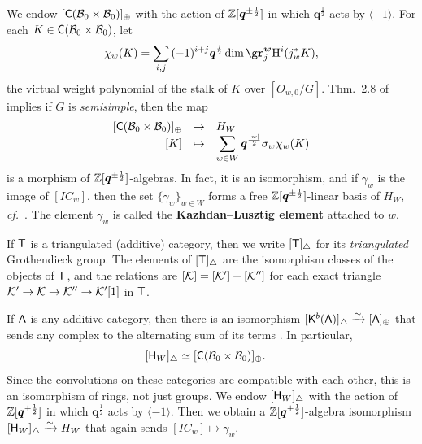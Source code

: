 \documentclass[a4paper,10pt,leqno]{amsart}
\theoremstyle{plain}
\theoremstyle{plain}
\theoremstyle{plain}
\theoremstyle{definition}
\theoremstyle{remark}
\newcommand{\dfemph}[1]{\textbf{#1}}
\newcommand{\IC}{\mathit{IC}}
\newcommand{\Q}{\bm{q}}
\begin{document}
We endow $[\sf{C}(\cal{B}_0 \times \cal{B}_0)]_\oplus$ with the action of $\bb{Z}[\Q^{\pm\frac{1}{2}}]$ in which $\Q^{\frac{1}{2}}$ acts by $\langle -1\rangle$.
For each $K \in \sf{C}(\cal{B}_0 \times \cal{B}_0)$, let
\begin{align}
\chi_w(K) = \sum_{i, j}
{(-1)^{i + j}} \Q^{\frac{j}{2}} \dim \gr_j^{\bm{w}} \ur{H}^i(j_w^\ast K),
\end{align}
the virtual weight polynomial of the stalk of $K$ over $[O_{w, 0}/G]$.
Thm.\ 2.8 of \cite{springer_1982} implies if $G$ is \emph{semisimple}, then the map
\begin{align}
\begin{array}{rcl}
{[\sf{C}(\cal{B}_0 \times \cal{B}_0)]_\oplus} &\to &H_W\\
{[K]} &\mapsto &\displaystyle\sum_{w \in W} \Q^{\frac{|w|}{2}} \sigma_w \chi_w(K)
\end{array}
\end{align}
is a morphism of $\bb{Z}[\Q^{\pm \frac{1}{2}}]$-algebras.
In fact, it is an isomorphism, and if $\gamma_w$ is the image of $[\IC_w]$, then the set $\{\gamma_w\}_{w \in W}$ forms a free $\bb{Z}[\Q^{\pm\frac{1}{2}}]$-linear basis of $H_W$, \emph{cf.}\ \cite[407]{ww_2011}.
The element $\gamma_w$ is called the \dfemph{Kazhdan--Lusztig element} attached to $w$.

If $\sf{T}$ is a triangulated (additive) category, then we write $[\sf{T}]_\triangle$ for its \emph{triangulated} Grothendieck group.
The elements of $[\sf{T}]_\triangle$ are the isomorphism classes of the objects of $\sf{T}$, and the relations are $[\cal{K}] = [\cal{K}'] + [\cal{K}'']$ for each exact triangle $\cal{K}' \to \cal{K} \to \cal{K}'' \to \cal{K}'[1]$ in $\sf{T}$.

If $\sf{A}$ is any additive category, then there is an isomorphism $[\sf{K}^b(\sf{A})]_\triangle \xrightarrow{\sim} [\sf{A}]_\oplus$ that sends any complex to the alternating sum of its terms \cite{rose}.
In particular,
\begin{align}\begin{split}
[\sf{H}_W]_\triangle 
&\simeq [\sf{C}(\cal{B}_0 \times \cal{B}_0)]_\oplus.
\end{split}\end{align}
Since the convolutions on these categories are compatible with each other, this is an isomorphism of rings, not just groups.
We endow $[\sf{H}_W]_\triangle$ with the action of $\bb{Z}[\Q^{\pm\frac{1}{2}}]$ in which $\Q^{\frac{1}{2}}$ acts by $\langle -1\rangle$.
Then we obtain a $\bb{Z}[\Q^{\pm\frac{1}{2}}]$-algebra isomorphism $[\sf{H}_W]_\triangle \xrightarrow{\sim} H_W$ that again sends $[\IC_w] \mapsto \gamma_w$.
\end{document}
